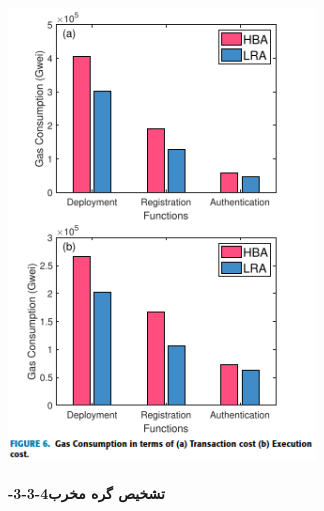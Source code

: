\documentclass{article} %
\begin{document}
\noindent 
{\bf \includegraphics*[width=3.21in, height=4.71in]{image16}}

\noindent 
\paragraph{ -3-3-4تشخیص گره مخرب}
\end{document}
